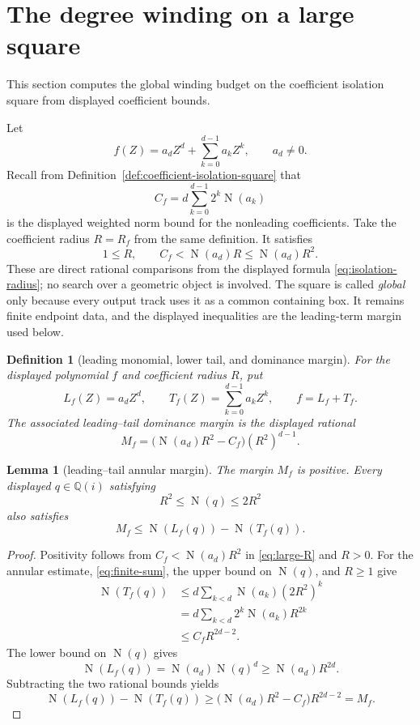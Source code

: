 \documentclass[11pt]{article}
\newtheorem{lemma}[theorem]{Lemma}
\newtheorem{definition}[theorem]{Definition}
\newcommand{\Qi}{\mathbb{Q}(i)}
\newcommand{\Norm}[1]{\operatorname{N}\!\left(#1\right)}
\newcommand{\Defref}[1]{Definition~\ref{#1}}
\begin{document}
\section{The degree winding on a large square}
\label{sec:global-winding}

This section computes the global winding budget on the coefficient isolation
square from displayed coefficient bounds.

Let
\[
       f(Z)=a_dZ^d+\sum_{k=0}^{d-1}a_kZ^k,
       \qquad a_d\ne0.
\]
Recall from \Defref{def:coefficient-isolation-square} that
\[
              C_f=d\sum_{k=0}^{d-1}2^k\Norm{a_k}
\]
is the displayed weighted norm bound for the nonleading coefficients.  Take
the coefficient radius $R=R_f$ from the same definition.  It satisfies
\begin{equation}
\label{eq:large-R}
             1\le R,\qquad C_f<\Norm{a_d}R\le\Norm{a_d}R^2.
\end{equation}
These are direct rational comparisons from the displayed formula
\eqref{eq:isolation-radius}; no search over a geometric object is involved.
The square is called \emph{global} only because every output track uses it as
a common containing box.  It remains finite endpoint data, and the displayed
inequalities are the leading-term margin used below.

\begin{definition}[leading monomial, lower tail, and dominance margin]
\label{def:leading-tail-margin}
For the displayed polynomial $f$ and coefficient radius $R$, put
\[
 L_f(Z)=a_dZ^d,
 \qquad
 T_f(Z)=\sum_{k=0}^{d-1}a_kZ^k,
 \qquad
 f=L_f+T_f.
\]
The associated \emph{leading--tail dominance margin} is the displayed
rational
\[
 M_f=\bigl(\Norm{a_d}R^2-C_f\bigr)(R^2)^{d-1}.
\]
\end{definition}

\begin{lemma}[leading--tail annular margin]
\label{lem:leading-tail-annular-margin}
The margin $M_f$ is positive.  Every displayed $q\in\Qi$ satisfying
\[
                   R^2\le\Norm q\le2R^2
\]
also satisfies
\[
       M_f\le \Norm{L_f(q)}-\Norm{T_f(q)}.
\]
\end{lemma}

\begin{proof}
Positivity follows from $C_f<\Norm{a_d}R^2$ in \eqref{eq:large-R} and
$R>0$.  For the annular estimate, \eqref{eq:finite-sum}, the upper bound on
$\Norm q$, and $R\ge1$ give
\[
\begin{aligned}
 \Norm{T_f(q)}
 &\le d\sum_{k<d}\Norm{a_k}(2R^2)^k\\
 &=d\sum_{k<d}2^k\Norm{a_k}R^{2k}\\
 &\le C_fR^{2d-2}.
\end{aligned}
\]
The lower bound on $\Norm q$ gives
\[
       \Norm{L_f(q)}=\Norm{a_d}\Norm q^d
       \ge\Norm{a_d}R^{2d}.
\]
Subtracting the two rational bounds yields
\[
 \Norm{L_f(q)}-\Norm{T_f(q)}
 \ge\bigl(\Norm{a_d}R^2-C_f\bigr)R^{2d-2}=M_f.
\]
\end{proof}
\end{document}
